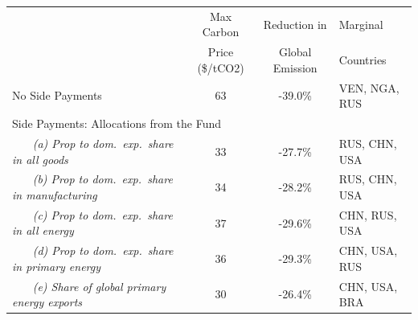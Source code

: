 \begin{center}
\small
\setlength{\tabcolsep}{4pt}
\renewcommand{\arraystretch}{1.25}
\begin{tabular}{l cc l}
\hline
 & Max Carbon & Reduction in  & Marginal \\
 & Price (\$/tCO2) & Global Emission & Countries \\
\hline
 No Side Payments & 63 & -39.0\% & VEN, NGA, RUS \\
\multicolumn{4}{l}{Side Payments: Allocations from the Fund} \\
 ~~~ \textit{(a) Prop to dom.\ exp.\ share in all goods} & 33 & -27.7\% & RUS, CHN, USA \\
 ~~~ \textit{(b) Prop to dom.\ exp.\ share in manufacturing} & 34 & -28.2\% & RUS, CHN, USA \\
 ~~~ \textit{(c) Prop to dom.\ exp.\ share in all energy} & 37 & -29.6\% & CHN, RUS, USA \\
 ~~~ \textit{(d) Prop to dom.\ exp.\ share in primary energy} & 36 & -29.3\% & CHN, USA, RUS \\
 ~~~ \textit{(e) Share of global primary energy exports} & 30 & -26.4\% & CHN, USA, BRA \\
\hline
\end{tabular}
\end{center}
